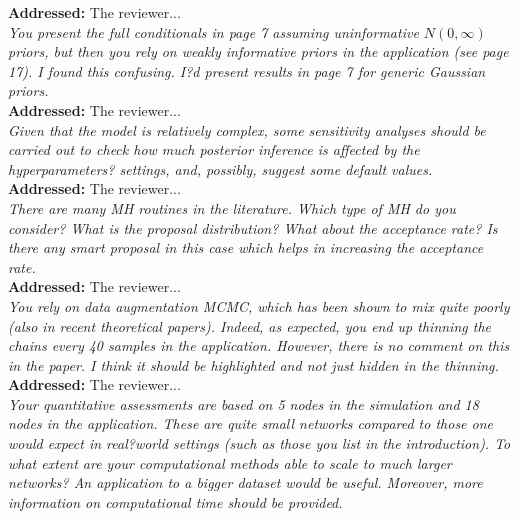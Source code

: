 \documentclass[12pt]{article}
\newcommand{\grey}[1]{{\color{mygrey}#1}}
\theoremstyle{definition}
\begin{document}
\noindent \textcolor{MyGreen}{\textbf{Addressed:}} The reviewer... \\


 \grey{\emph{You present the full conditionals in page 7 assuming uninformative $N(0, \infty)$ priors, but then you rely on weakly informative priors in the application (see page 17). I found this confusing. I?d present results in page 7 for generic Gaussian priors.}}\\

\noindent \textcolor{MyGreen}{\textbf{Addressed:}} The reviewer... \\


 \grey{\emph{Given that the model is relatively complex, some sensitivity analyses should be carried out to check how much posterior inference is affected by the hyperparameters? settings, and, possibly, suggest some default values.}}\\

\noindent \textcolor{MyGreen}{\textbf{Addressed:}} The reviewer... \\


 \grey{\emph{There are many MH routines in the literature. Which type of MH do you consider? What is the proposal distribution? What about the acceptance rate? Is there any smart proposal in this case which helps in increasing the acceptance rate.}}\\

\noindent \textcolor{MyGreen}{\textbf{Addressed:}} The reviewer... \\


 \grey{\emph{You rely on data augmentation MCMC, which has been shown to mix quite poorly (also in recent theoretical papers). Indeed, as expected, you end up thinning the chains every 40 samples in the application. However, there is no comment on this in the paper. I think it should be highlighted and not just hidden in the thinning.}}\\

\noindent \textcolor{MyGreen}{\textbf{Addressed:}} The reviewer... \\


 \grey{\emph{Your quantitative assessments are based on 5 nodes in the simulation and 18 nodes in the application. These are quite small networks compared to those one would expect in real?world settings (such as those you list in the introduction). To what extent are your computational methods able to scale to much larger networks? An application to a bigger dataset would be useful. Moreover, more information on computational time should be provided.}}\\
\end{document}
